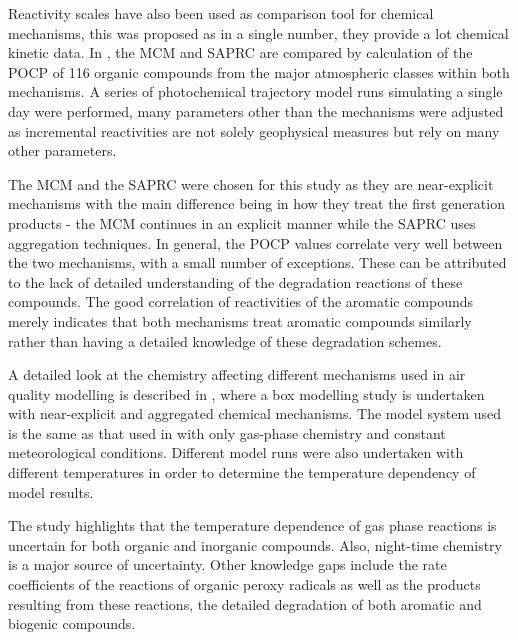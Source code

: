 Reactivity scales have also been used as comparison tool for chemical mechanisms, this was proposed as in a single number, they provide a lot chemical kinetic data. 
In \citep{Derwent:2010}, the MCM and SAPRC are compared by calculation of the POCP of 116 organic compounds from the major atmospheric classes within both mechanisms. 
A series of photochemical trajectory model runs simulating a single day were performed, many parameters other than the mechanisms were adjusted as incremental reactivities are not solely geophysical measures but rely on many other parameters.

The MCM and the SAPRC were chosen for this study as they are near-explicit mechanisms with the main difference being in how they treat the first generation products - the MCM continues in an explicit manner while the SAPRC uses aggregation techniques. 
In general, the POCP values correlate very well between the two mechanisms, with a small number of exceptions. 
These can be attributed to the lack of detailed understanding of the degradation reactions of these compounds. 
The good correlation of reactivities of the aromatic compounds merely indicates that both mechanisms treat aromatic compounds similarly rather than having a detailed knowledge of these degradation schemes.

A detailed look at the chemistry affecting different mechanisms used in air quality modelling is described in \citep{Stockwell:2012}, where a box modelling study is undertaken with near-explicit and aggregated chemical mechanisms. 
The model system used is the same as that used in \citep{Seefeld:1999} with only gas-phase chemistry and constant meteorological conditions.  
Different model runs were also undertaken with different temperatures in order to determine the temperature dependency of model results. 

The study highlights that the temperature dependence of gas phase reactions is uncertain for both organic and inorganic compounds. 
Also, night-time chemistry is a major source of uncertainty. 
Other knowledge gaps include the rate coefficients of the reactions of organic peroxy radicals as well as the products resulting from these reactions, the detailed degradation of both aromatic and biogenic compounds.  
